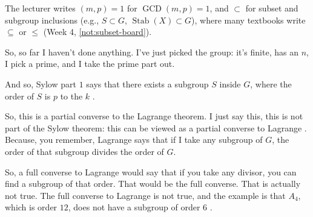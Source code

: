 \begin{aiNote}
The lecturer writes $(m, p) = 1$ for $\operatorname{GCD}(m, p) = 1$, and $\subset$ for subset and subgroup inclusions (e.g., $S \subset G$, $\operatorname{Stab}(X) \subset G$), where many textbooks write $\subseteq$ or $\le$ (Week 4, \cref{not:subset-board}).
\end{aiNote}

\begin{speech}[00:00:53 - 00:01:22]
So, so far I haven't done anything. I've just picked the group: it's finite, has an $n$, I pick a prime, and I take the prime part out.

And so, Sylow part $1$ says that there exists a subgroup $S$ inside $G$, where the order of $S$ is $p$ to the $k$ .
\end{speech}

\begin{content}
\end{content}

\begin{speech}[00:01:22 - 00:02:18]
So, this is a partial converse to the Lagrange theorem. I just say this, this is not part of the Sylow theorem: this can be viewed as a partial converse to Lagrange . Because, you remember, Lagrange says that if I take any subgroup of $G$, the order of that subgroup divides the order of $G$.

So, a full converse to Lagrange would say that if you take any divisor, you can find a subgroup of that order. That would be the full converse. That is actually not true. The full converse to Lagrange is not true, and the example is that $A_4$, which is order $12$, does not have a subgroup of order $6$ .
\end{speech}

